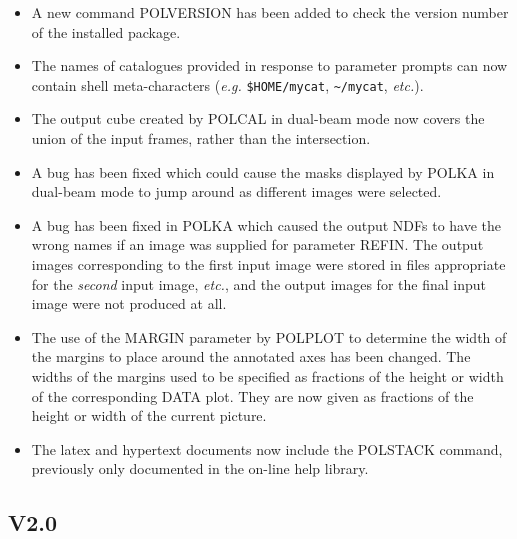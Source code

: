 \documentclass[twoside,11pt]{article}
\newcommand{\htmlref}[2]{#1}
\renewcommand{\_}{\texttt{\symbol{95}}}
\begin{document}
\begin{itemize}

\item A new command \htmlref{POLVERSION}{POLVERSION} has been added to check
the version number of the installed package.

\item The names of catalogues provided in response to parameter prompts 
can now contain shell meta-characters (\emph{e.g.} \verb+$HOME/mycat+, 
\verb+~/mycat+, \emph{etc.}).

\item The output cube created by POLCAL in dual-beam mode now covers the
union of the input frames, rather than the intersection.

\item A bug has been fixed which could cause the masks displayed by POLKA 
in dual-beam mode to jump around as different images were selected.

\item A bug has been fixed in POLKA which caused the output NDFs to have 
the wrong names if an image was supplied for parameter REFIN. The output
images corresponding to the first input image were stored in files
appropriate for the \emph{second} input image, \emph{etc.}, and the 
output images for the final input image were not produced at all.

\item The use of the MARGIN parameter by POLPLOT to determine the width of
the margins to place around the annotated axes has been changed. The widths
of the margins used to be specified as fractions of the height or width
of the corresponding DATA plot. They are now given as fractions of the
height or width of the current picture.

\item The latex and hypertext documents now include the POLSTACK command,
previously only documented in the on-line help library.

\end{itemize}

\subsection{V2.0}
\end{document}
